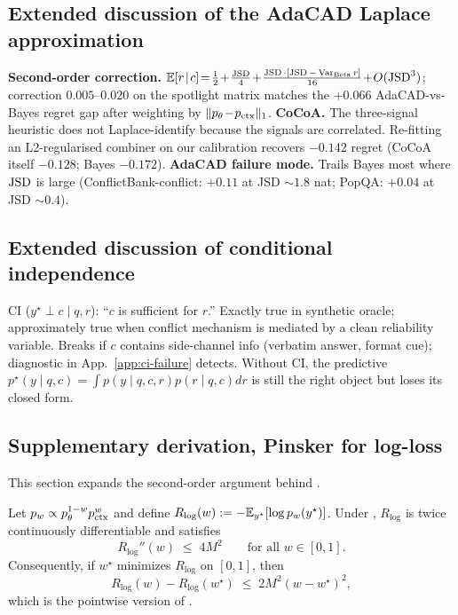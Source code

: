 \subsection{Extended discussion of the AdaCAD Laplace approximation}
\label{app:adacad-extended}

\textbf{Second-order correction.}
$\E[\reli\!\mid\!c]\!=\!\tfrac12\!+\!\tfrac{\JSD}{4}\!+\!\tfrac{\JSD\cdot[\JSD-\Var_{\textrm{Beta}}r]}{16}\!+\!O(\JSD^3)$;
correction $0.005$--$0.020$ on the spotlight matrix matches the
$+0.066$ AdaCAD-vs-Bayes regret gap after weighting by
$\|p_\theta\!-\!p_{\mathrm{ctx}}\|_1$.
\textbf{CoCoA.}  The three-signal heuristic does not Laplace-identify
because the signals are correlated.  Re-fitting an L2-regularised
combiner on our calibration recovers $-0.142$ regret (CoCoA itself
$-0.128$; Bayes $-0.172$).
\textbf{AdaCAD failure mode.}  Trails Bayes most where $\operatorname{JSD}$ is
large (ConflictBank-conflict: $+0.11$ at JSD $\sim\!1.8$ nat;
PopQA: $+0.04$ at JSD $\sim\!0.4$).


\subsection{Extended discussion of conditional independence}
\label{app:ci-extended}

CI ($y^\star\!\perp\!c\!\mid\!q,r$): ``$c$ is sufficient for
$r$.''  Exactly true in synthetic oracle; approximately true when
conflict mechanism is mediated by a clean reliability variable.
Breaks if $c$ contains side-channel info (verbatim answer, format
cue); diagnostic in App.~\ref{app:ci-failure} detects.  Without
CI, the predictive
$p^\star(y\!\mid\!q,c)\!=\!\int p(y\!\mid\!q,c,r)p(r\!\mid\!q,c)dr$
is still the right object but loses its closed form.


\subsection{Supplementary derivation, Pinsker for log-loss}
\label{app:pinsker-logloss}

This section expands the second-order argument behind
.

\begin{proposition}
\label{prop:logloss-second-order}
Let $p_w\propto p_\theta^{1-w}p_{\mathrm{ctx}}^w$ and define
$R_{\log}(w):=-\mathbb{E}_{y^\star}[\log p_w(y^\star)]$.  Under
, $R_{\log}$ is twice continuously
differentiable and satisfies
\[
R_{\log}''(w)\;\leq\;4M^2\qquad\text{for all }w\in[0,1].
\]
Consequently, if $w^\star$ minimizes $R_{\log}$ on $[0,1]$, then
\[
R_{\log}(w)-R_{\log}(w^\star)\;\leq\;2M^2(w-w^\star)^2,
\]
which is the pointwise version of .
\end{proposition}

